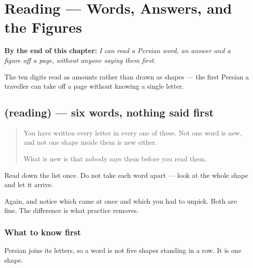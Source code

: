 
\chapter{Reading — Words, Answers, and the Figures}
\label{ch:fa-khandan}

\begin{chapteropening}
\textbf{By the end of this chapter:} \emph{I can read a Persian word, an answer and a figure off a page, without anyone saying them first.}

The ten digits read as amounts rather than drawn as shapes — the first Persian a traveller can take off a page without knowing a single letter.
\end{chapteropening}

\section[(reading)]{(reading) — six words, nothing said first}

\label{lesson:FA-C21-words}



\begin{quote}
You have written every letter in every one of these. Not one word is new, and not one shape inside them is new either.

What is new is that nobody says them before you read them.
\end{quote}

\begin{tcolorbox}[breakable,skin=enhanced,colback=orange!6,colframe=orange!45!black,boxrule=0.5pt,arc=1mm,left=6pt,right=6pt,top=4pt,bottom=4pt,fonttitle=\bfseries,title={Read this}]
\begin{quote}
     
\end{quote}

Read down the list once. Do not take each word apart — look at the whole shape and let it arrive.

Again, and notice which came at once and which you had to unpick. Both are fine. The difference is what practice removes.
\end{tcolorbox}

\subsection*{What to know first}
Persian joins its letters, so a word is not five shapes standing in a row. It is one shape.

